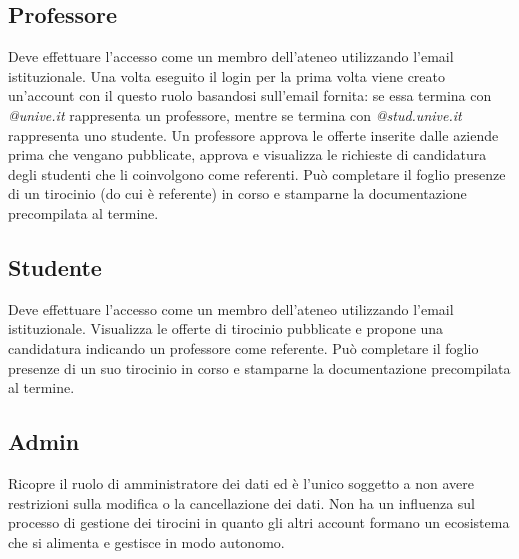 \subsection{Professore}
Deve effettuare l'accesso come un membro dell'ateneo utilizzando l'email istituzionale. Una volta eseguito il login per la prima volta viene creato un'account con il questo ruolo basandosi sull'email fornita: se essa termina con \textit{@unive.it} rappresenta un professore, mentre se termina con \textit{@stud.unive.it} rappresenta uno studente. 
Un professore approva le offerte inserite dalle aziende prima che vengano pubblicate, approva e visualizza le richieste di candidatura degli studenti che li coinvolgono come referenti. Può completare il foglio presenze di un tirocinio (do cui è referente) in corso e stamparne la documentazione precompilata al termine.

\subsection{Studente}
Deve effettuare l'accesso come un membro dell'ateneo utilizzando l'email istituzionale. Visualizza le offerte di tirocinio pubblicate e propone una candidatura indicando un professore come referente. Può completare il foglio presenze di un suo tirocinio in corso e stamparne la documentazione precompilata al termine.

\subsection{Admin}
Ricopre il ruolo di amministratore dei dati ed è l'unico soggetto a non avere restrizioni sulla modifica o la cancellazione dei dati. Non ha un influenza sul processo di gestione dei tirocini in quanto gli altri account formano un ecosistema che si alimenta e gestisce in modo autonomo.